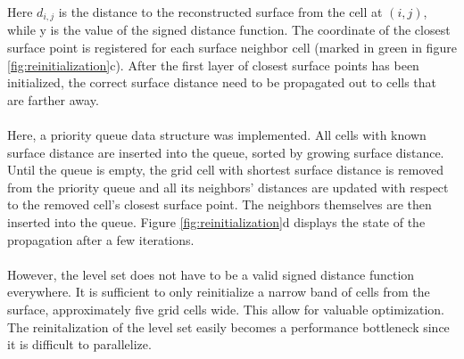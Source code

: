 \documentclass[twocolumn]{article}
\begin{document}
Here $d_{i,j}$ is the distance to the reconstructed surface from the cell at $(i, j)$, while y is the value of the signed distance function.
The coordinate of the closest surface point is registered for each surface neighbor cell (marked in green in figure \ref{fig:reinitialization}c). After the first layer of closest surface points has been initialized, the correct surface distance need to be propagated out to cells that are farther away.
\\\\
Here, a priority queue data structure was implemented. All cells with known surface distance are inserted into the queue, sorted by growing surface distance. Until the queue is empty, the grid cell with shortest surface distance is removed from the priority queue and all its neighbors' distances are updated with respect to the removed cell's closest surface point. The neighbors themselves are then inserted into the queue. Figure \ref{fig:reinitialization}d displays the state of the propagation after a few iterations.
\\\\
However, the level set does not have to be a valid signed distance function everywhere. It is sufficient to only reinitialize a narrow band of cells from the surface, approximately five grid cells wide. This allow for valuable optimization. The reinitalization of the level set easily becomes a performance bottleneck since it is  difficult to parallelize.
\end{document}
